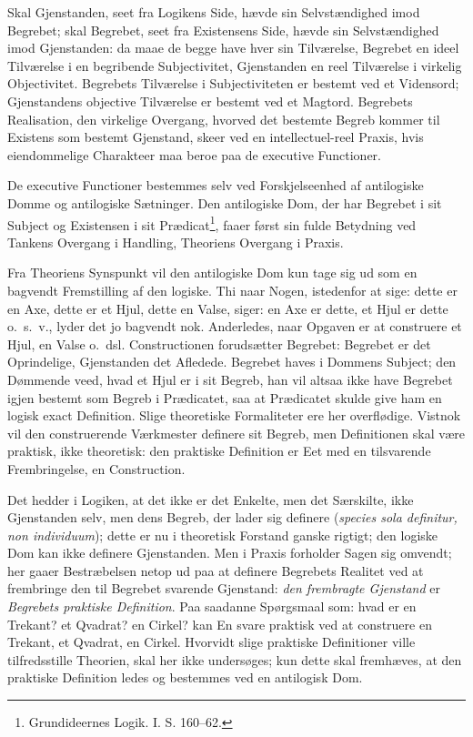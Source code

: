 \documentclass[12pt]{book}
\newcommand{\opage}[1]{\marginnote{\footnotesize\textit{[#1]}}}
\begin{document}
Skal Gjenstanden, seet fra Logikens Side, hævde sin
Selvstændighed imod Begrebet; skal Begrebet, seet fra Existensens
Side, hævde sin Selvstændighed imod Gjenstanden:
\opage{135}da maae de begge have hver sin Tilværelse, Begrebet en ideel
Tilværelse i en begribende Subjectivitet, Gjenstanden en reel
Tilværelse i virkelig Objectivitet. Begrebets Tilværelse i
Subjectiviteten er bestemt ved et Vidensord; Gjenstandens
objective Tilværelse er bestemt ved et Magtord. Begrebets
Realisation, den virkelige Overgang, hvorved det bestemte Begreb
kommer til Existens som bestemt Gjenstand, skeer ved en
intellectuel-reel Praxis, hvis eiendommelige Charakteer maa
beroe paa de executive Functioner.

De executive Functioner bestemmes selv ved Forskjelseenhed
af antilogiske Domme og antilogiske Sætninger. Den
antilogiske Dom, der har Begrebet i sit Subject og Existensen
i sit Prædicat\footnote{Grundideernes Logik. I. S. 160--62.}, %
faaer først sin fulde Betydning ved Tankens
Overgang i Handling, Theoriens Overgang i Praxis.

Fra Theoriens Synspunkt vil den antilogiske Dom kun
tage sig ud som en bagvendt Fremstilling af den logiske.
Thi naar Nogen, istedenfor at sige: dette er en Axe, dette er
et Hjul, dette en Valse, siger: en Axe er dette, et Hjul er
dette o.\ s.\ v., lyder det jo bagvendt nok. Anderledes, naar
Opgaven er at construere et Hjul, en Valse o.\ dsl. Constructionen
forudsætter Begrebet: Begrebet er det Oprindelige,
Gjenstanden det Afledede. Begrebet haves i Dommens Subject;
den Dømmende veed, hvad et Hjul er i sit Begreb, han
vil altsaa ikke have Begrebet igjen bestemt som Begreb i Prædicatet,
saa at Prædicatet skulde give ham en logisk exact
Definition. Slige theoretiske Formaliteter ere her overflødige.
Vistnok vil den construerende Værkmester definere sit Begreb,
men Definitionen skal være praktisk, ikke theoretisk: den praktiske
Definition er Eet med en tilsvarende Frembringelse, en
Construction.

Det hedder i Logiken, at det ikke er det Enkelte, men
det Særskilte, ikke Gjenstanden selv, men dens Begreb, der
\opage{136}lader sig definere (\textit{species sola definitur, non individuum});
dette er nu i theoretisk Forstand ganske rigtigt; den logiske
Dom kan ikke definere Gjenstanden. Men i Praxis forholder
Sagen sig omvendt; her gaaer Bestræbelsen netop ud paa at
definere Begrebets Realitet ved at frembringe den til Begrebet
svarende Gjenstand: \emph{den frembragte Gjenstand} er
\emph{Begrebets praktiske Definition}. Paa saadanne Spørgsmaal
som: hvad er en Trekant? et Qvadrat? en Cirkel? kan
En svare praktisk ved at construere en Trekant, et Qvadrat,
en Cirkel. Hvorvidt slige praktiske Definitioner ville tilfredsstille
Theorien, skal her ikke undersøges; kun dette skal fremhæves,
at den praktiske Definition ledes og bestemmes ved en
antilogisk Dom.
\end{document}
